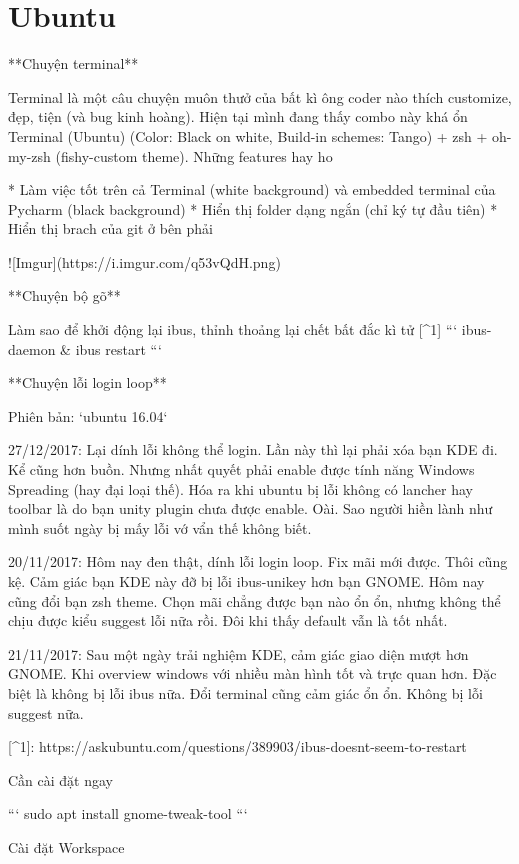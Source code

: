 \chapter{Ubuntu}

**Chuyện terminal**

Terminal là một câu chuyện muôn thưở của bất kì ông coder nào thích customize, đẹp, tiện (và bug kinh hoàng). Hiện tại mình đang thấy combo này khá ổn Terminal (Ubuntu) (Color: Black on white, Build-in schemes: Tango) + zsh + oh-my-zsh (fishy-custom theme). Những features hay ho

* Làm việc tốt trên cả Terminal (white background) và embedded terminal của Pycharm (black background)
* Hiển thị folder dạng ngắn (chỉ ký tự đầu tiên)
* Hiển thị brach của git ở bên phải

![Imgur](https://i.imgur.com/q53vQdH.png)

**Chuyện bộ gõ**

Làm sao để khởi động lại ibus, thỉnh thoảng lại chết bất đắc kì tử [^1]
```
ibus-daemon &
ibus restart
```

**Chuyện lỗi login loop**

Phiên bản: `ubuntu 16.04`


27/12/2017: Lại dính lỗi không thể login. Lần này thì lại phải xóa bạn KDE đi. Kể cũng hơn buồn. Nhưng nhất quyết phải enable được tính năng Windows Spreading (hay đại loại thế). Hóa ra khi ubuntu bị lỗi không có lancher hay toolbar là do bạn unity plugin chưa được enable. Oài. Sao người hiền lành như mình suốt ngày bị mấy lỗi vớ vẩn thế không biết.

20/11/2017: Hôm nay đen thật, dính lỗi login loop. Fix mãi mới được. Thôi cũng kệ. Cảm giác bạn KDE này đỡ bị lỗi ibus-unikey hơn bạn GNOME. Hôm nay cũng đổi bạn zsh theme. Chọn mãi chẳng được bạn nào ổn ổn, nhưng không thể chịu được kiểu suggest lỗi nữa rồi. Đôi khi thấy default vẫn là tốt nhất.

21/11/2017: Sau một ngày trải nghiệm KDE, cảm giác giao diện mượt hơn GNOME. Khi overview windows với nhiều màn hình tốt và trực quan hơn. Đặc biệt là không bị lỗi ibus nữa. Đổi terminal cũng cảm giác ổn ổn. Không bị lỗi suggest nữa.

[^1]: https://askubuntu.com/questions/389903/ibus-doesnt-seem-to-restart

Cần cài đặt ngay

```
sudo apt install gnome-tweak-tool
```

Cài đặt Workspace